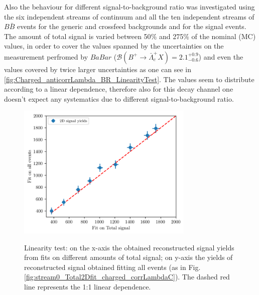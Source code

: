 \noindent  Also the behaviour for different signal-to-background ratio was investigated using the six independent streams of continuum and all the ten independent streams of $B\bar{B}$ events for the generic and crossfeed backgrounds and for the signal events. 
The amount of total signal is varied between 50$\%$ and 275$\%$ of the nominal (MC) values, in order to cover the values spanned by the uncertainties on the measurement perfromed by $BaBar$ ($\mathcal{B}(B^+ \rightarrow \bar{\Lambda}_c^+ X) = 2.1^{+0.9}_{-0.6} $)
 and even the values covered by twice larger uncertainties as one can see in \cref{fig:Charged_anticorrLambda_BR_LinearityTest}. 
The values seem to distribute according to a linear dependence,  therefore also for this decay channel one doesn't expect any systematics due to different signal-to-background ratio.%


\begin{figure}[H]
{\includegraphics[width=0.75\textwidth]{06-chargedAnticorrBtoLambda/figs/Charged_anticorrLambda_LinearityTest.png}}
\caption{Linearity test: on the x-axis the obtained reconstructed signal yields from fits on different amounts of total signal; on y-axis the yields of reconstructed signal obtained fitting all events
 (as in Fig. \ref{fig:stream0_Total2Dfit_charged_corrLambdaC}). The dashed red line represents the 1:1 linear dependence.}
\label{fig:Charged_anticorrLambda_LinearityTest}
\end{figure}




